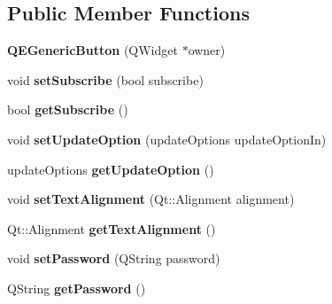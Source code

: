 \subsection*{Public Member Functions}
\begin{DoxyCompactItemize}
\item 
\hypertarget{classQEGenericButton_ad2c5cbe3ac38864e0816df7cac891056}{
{\bfseries QEGenericButton} (QWidget $\ast$owner)}
\label{classQEGenericButton_ad2c5cbe3ac38864e0816df7cac891056}

\item 
\hypertarget{classQEGenericButton_aeeffd2d96f84dd6a568b310aa9e60b1c}{
void {\bfseries setSubscribe} (bool subscribe)}
\label{classQEGenericButton_aeeffd2d96f84dd6a568b310aa9e60b1c}

\item 
\hypertarget{classQEGenericButton_aebe8a323388b1619475554365258b5c4}{
bool {\bfseries getSubscribe} ()}
\label{classQEGenericButton_aebe8a323388b1619475554365258b5c4}

\item 
\hypertarget{classQEGenericButton_af99ed76082a5ae2644c62d5b16942440}{
void {\bfseries setUpdateOption} (updateOptions updateOptionIn)}
\label{classQEGenericButton_af99ed76082a5ae2644c62d5b16942440}

\item 
\hypertarget{classQEGenericButton_afca2595c619728943587ffa65a1c7c6b}{
updateOptions {\bfseries getUpdateOption} ()}
\label{classQEGenericButton_afca2595c619728943587ffa65a1c7c6b}

\item 
\hypertarget{classQEGenericButton_a8754e68c2fff530abdb82fdfc6cc8aa9}{
void {\bfseries setTextAlignment} (Qt::Alignment alignment)}
\label{classQEGenericButton_a8754e68c2fff530abdb82fdfc6cc8aa9}

\item 
\hypertarget{classQEGenericButton_a6ae4c5da2ca529cb21cbe0844b57dda1}{
Qt::Alignment {\bfseries getTextAlignment} ()}
\label{classQEGenericButton_a6ae4c5da2ca529cb21cbe0844b57dda1}

\item 
\hypertarget{classQEGenericButton_a1471cc9ac63ac34544ce4ee3840b6719}{
void {\bfseries setPassword} (QString password)}
\label{classQEGenericButton_a1471cc9ac63ac34544ce4ee3840b6719}

\item 
\hypertarget{classQEGenericButton_a4080feab759638a9b83d43182ebc7f58}{
QString {\bfseries getPassword} ()}
\label{classQEGenericButton_a4080feab759638a9b83d43182ebc7f58}


\end{DoxyCompactItemize}
